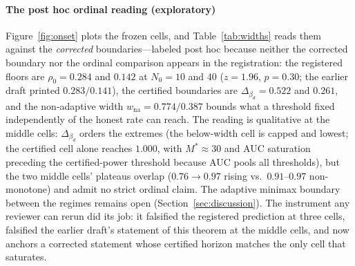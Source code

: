 \paragraph{The post hoc ordinal reading (exploratory)}
Figure~\ref{fig:onset} plots the frozen cells, and Table~\ref{tab:widths}
reads them against the \emph{corrected} boundaries---labeled post hoc
because neither the corrected boundary nor the ordinal comparison appears
in the registration: the registered floors are
$\rho_0=0.284$ and $0.142$ at $N_0=10$ and $40$ ($z=1.96$, $p=0.30$; the
earlier draft printed $0.283/0.141$), the certified boundaries are
$\Delta_{\beta_d}=0.522$ and $0.261$, and the non-adaptive width
$w_{\mathrm{na}}=0.774/0.387$ bounds what a threshold fixed independently
of the honest rate can reach. The reading is qualitative at the middle
cells: $\Delta_{\beta_d}$ orders the extremes (the below-width cell is
capped and lowest; the certified cell alone reaches $1.000$, with
$M^{*}\approx30$ and AUC saturation preceding the certified-power
threshold because AUC pools all thresholds), but the two middle cells'
plateaus overlap ($0.76\to0.97$ rising vs.\ $0.91$--$0.97$ non-monotone)
and admit no strict ordinal claim. The adaptive minimax boundary between
the regimes remains open (Section~\ref{sec:discussion}). The instrument
any reviewer can rerun did its job: it falsified the registered
prediction at three cells, falsified the earlier draft's statement of
this theorem at the middle cells, and now anchors a corrected statement
whose certified horizon matches the only cell that saturates.

